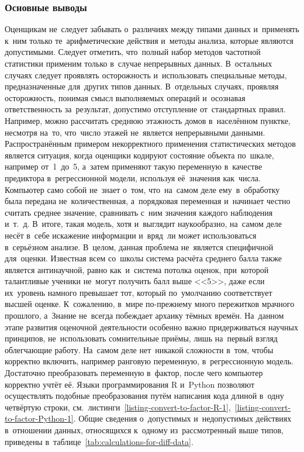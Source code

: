 \documentclass[]{scrartcl}
\begin{document}
\subsubsection{Основные выводы}
Оценщикам не~следует забывать о~различиях между типами данных и~применять к~ним только те~арифметические действия и~методы анализа, которые являются допустимыми. Следует отметить, что~полный набор методов частотной статистики применим только в~случае непрерывных данных. В~остальных случаях следует проявлять осторожность и~использовать специальные методы, предназначенные для~других типов данных. В~отдельных случаях, проявляя осторожность, понимая смысл выполняемых операций и~осознавая ответственность за~результат, допустимо отступление от~стандартных правил. Например, можно рассчитать среднюю этажность домов в~населённом пунктке, несмотря на~то, что~число этажей не~является непрерывными данными. Распространённым примером некорректного применения статистических методов является ситуация, когда оценщики кодируют состояние объекта по~шкале, например от~1~до~5, а~затем применяют такую переменную в~качестве предиктора в~регрессионной модели, используя её~значения как~числа. Компьютер само собой не~знает о~том, что~на~самом деле ему~в~обработку была передана не~количественная, а~порядковая переменная и~начинает честно считать среднее значение, сравнивать с~ним значения каждого наблюдения и~т.~д. В~итоге, такая модель, хотя и~выглядит наукообразно, на~самом деле несёт в~себе искажение информации и~вряд~ли может использоваться в~серьёзном анализе. В~целом, данная проблема не~является специфичной для~оценки. Известная всем со~школы система расчёта среднего балла также является  антинаучной, равно как~и~система потолка оценок, при~которой талантливые ученики не~могут получить балл выше <<5>>, даже если их~уровень намного превышает тот, который по~умолчанию соответствует высшей оценке. К~сожалению, в~мире по-прежнему много пережитков мрачного прошлого, а~Знание не~всегда побеждает архаику тёмных времён. На~данном этапе развития оценочной деятельности особенно важно придерживаться научных принципов, не~использовать сомнительные приёмы, лишь на~первый взгляд облегчающие работу. На~самом деле нет~никакой сложности в~том, чтобы корректно включить, например ранговую переменную, в~регрессионную модель. Достаточно преобразовать переменную в~фактор, после чего компьютер корректно учтёт её. Языки программирования R и~Python позволяют осуществлять подобные преобразования путём написания кода длиной в~одну четвёртую строки, см.~листинги~\ref{listing-convert-to-factor-R-1},~\ref{listing-convert-to-factor-Python-1}. Общие сведения о~допустимых и~недопустимых действиях в~отношении данных, относящихся к~одному из~рассмотренный выше типов, приведены в~таблице~\ref{tab:calculations-for-diff-data}.
\end{document}
